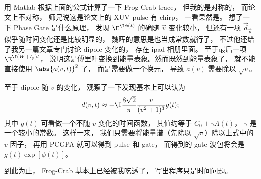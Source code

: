 用 Matlab 根据上面的公式计算了一下 Frog-Crab trace， 但我的是对称的， 而论文上不对称， 师兄说这是论文上的 XUV pulse 有 chirp， 一看果然是。 想了一下 Phase Gate 是什么原理， 发现 $\E^{\I\phi(t)}$ 的确随 $\vec v$ 变化较小， 但还有一项 $\vec d_{\vec p}$ 似乎随时间变化还是比较明显的， 魏晖的意思是也当成常数就行了， 不过他还给了我另一篇文章专门讨论 dipole 变化的， 存在 ipad 相册里面。 至于最后一项 $\E^{\I(W+I_p)t}$， 说明这是傅里叶变换到能量表象。然而既然到能量表象了， 就不能直接使用 $\abs{a(v, t)}^2$ 了， 而是需要做一个换元， 导致 $a(v)$ 需要除以 $\sqrt{v}$。

至于 dipole 随 $v$ 的变化， 观察了一下发现基本上可以认为
\begin{equation}
d(v, t) \approx -\I \frac{8\sqrt2}{\pi} \frac{v}{(v^2+1)^3} g(t);
\end{equation}
其中 $g(t)$ 可看做一个不随 $v$ 变化的时间函数， 其值约等于 $C_0 + \gamma A(t)$， $\gamma$ 是一个较小的常数。 这样一来， 我们只需要将能量谱（先除以 $\sqrt{v}$）除以上式中的 $v$ 因子， 再用 PCGPA 就可以得到 pulse 和 gate， 而得到的 gate 波包将会是 $g(t)\exp[\phi(t)]$。

到此为止， Frog-Crab 基本上已经被我吃透了， 写出程序只是时间问题。
